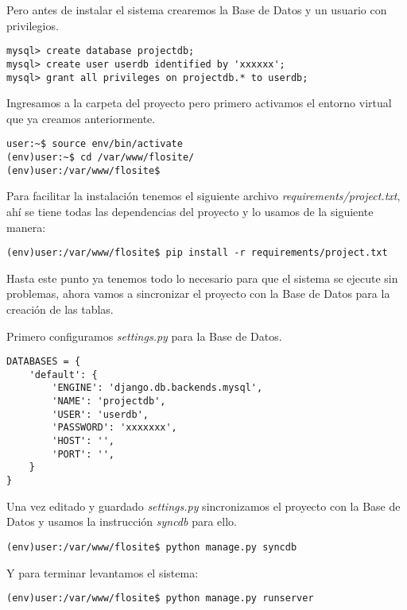 Pero antes de instalar el sistema crearemos la Base de Datos y un usuario con
privilegios.

\begin{verbatim}
mysql> create database projectdb;
mysql> create user userdb identified by 'xxxxxx';
mysql> grant all privileges on projectdb.* to userdb;
\end{verbatim}

Ingresamos a la carpeta del proyecto pero primero activamos el entorno virtual
que ya creamos anteriormente.

\begin{verbatim}
user:~$ source env/bin/activate
(env)user:~$ cd /var/www/flosite/
(env)user:/var/www/flosite$
\end{verbatim}

Para facilitar la instalación tenemos el siguiente archivo
{\it requirements/project.txt}, ahí se tiene todas las dependencias del proyecto
y lo usamos de la siguiente manera:

\begin{verbatim}
(env)user:/var/www/flosite$ pip install -r requirements/project.txt
\end{verbatim}

Hasta este punto ya tenemos todo lo necesario para que el sistema se ejecute sin
problemas, ahora vamos a sincronizar el proyecto con la Base de Datos para la
creación de las tablas.

Primero configuramos {\it settings.py} para la Base de Datos.

\begin{verbatim}
DATABASES = {
    'default': {
        'ENGINE': 'django.db.backends.mysql',
        'NAME': 'projectdb',
        'USER': 'userdb',
        'PASSWORD': 'xxxxxxx',
        'HOST': '',
        'PORT': '',
    }
}
\end{verbatim}

Una vez editado y guardado {\it settings.py} sincronizamos el proyecto con la
Base de Datos y usamos la instrucción {\it syncdb} para ello.

\begin{verbatim}
(env)user:/var/www/flosite$ python manage.py syncdb
\end{verbatim}

Y para terminar levantamos el sistema:

\begin{verbatim}
(env)user:/var/www/flosite$ python manage.py runserver
\end{verbatim}

